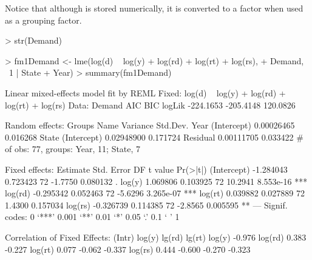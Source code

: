 \documentclass[12pt]{article}
\begin{document}
Notice that although  is stored numerically, it is
converted to a factor when used as a grouping factor.
\begin{Schunk}
\begin{Sinput}
> str(Demand)
\end{Sinput}
\begin{Sinput}
> fm1Demand <- lme(log(d) ~ log(y) + log(rd) + log(rt) + log(rs), 
+     Demand, ~1 | State + Year)
> summary(fm1Demand)
\end{Sinput}
\begin{Soutput}
Linear mixed-effects model fit by REML
Fixed: log(d) ~ log(y) + log(rd) + log(rt) + log(rs) 
 Data: Demand 
       AIC       BIC   logLik
 -224.1653 -205.4148 120.0826

Random effects:
 Groups   Name        Variance   Std.Dev.
 Year     (Intercept) 0.00026465 0.016268
 State    (Intercept) 0.02948900 0.171724
 Residual             0.00111705 0.033422
# of obs: 77, groups: Year, 11; State, 7

Fixed effects:
             Estimate Std. Error DF t value  Pr(>|t|)    
(Intercept) -1.284043   0.723423 72 -1.7750  0.080132 .  
log(y)       1.069806   0.103925 72 10.2941 8.553e-16 ***
log(rd)     -0.295342   0.052463 72 -5.6296 3.265e-07 ***
log(rt)      0.039882   0.027889 72  1.4300  0.157034    
log(rs)     -0.326739   0.114385 72 -2.8565  0.005595 ** 
---
Signif. codes:  0 `***' 0.001 `**' 0.01 `*' 0.05 `.' 0.1 ` ' 1 

Correlation of Fixed Effects:
        (Intr) log(y) lg(rd) lg(rt)
log(y)  -0.976                     
log(rd)  0.383 -0.227              
log(rt)  0.077 -0.062 -0.337       
log(rs)  0.444 -0.600 -0.270 -0.323
\end{Soutput}
\end{Schunk}
\end{document}
